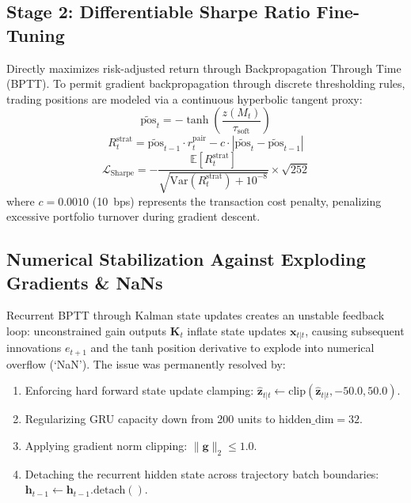 \documentclass[11pt, a4paper]{article}
\begin{document}
\subsection{Stage 2: Differentiable Sharpe Ratio Fine-Tuning}
Directly maximizes risk-adjusted return through Backpropagation Through Time (BPTT). To permit gradient backpropagation through discrete thresholding rules, trading positions are modeled via a continuous hyperbolic tangent proxy:
\begin{equation}
    \widetilde{\text{pos}}_t = -\tanh\left( \frac{z(M_t)}{\tau_{\text{soft}}} \right)
\end{equation}
\begin{equation}
    R_t^{\text{strat}} = \widetilde{\text{pos}}_{t-1} \cdot r_t^{\text{pair}} - c \cdot |\widetilde{\text{pos}}_t - \widetilde{\text{pos}}_{t-1}|
\end{equation}
\begin{equation}
    \mathcal{L}_{\text{Sharpe}} = - \frac{\mathbb{E}[R_t^{\text{strat}}]}{\sqrt{\text{Var}(R_t^{\text{strat}}) + 10^{-8}}} \times \sqrt{252}
\end{equation}
where $c = 0.0010$ (10~bps) represents the transaction cost penalty, penalizing excessive portfolio turnover during gradient descent.

\subsection{Numerical Stabilization Against Exploding Gradients \& NaNs}
Recurrent BPTT through Kalman state updates creates an unstable feedback loop: unconstrained gain outputs $\mathbf{K}_t$ inflate state updates $\mathbf{x}_{t|t}$, causing subsequent innovations $e_{t+1}$ and the tanh position derivative to explode into numerical overflow (`NaN'). The issue was permanently resolved by:
\begin{enumerate}
    \item Enforcing hard forward state update clamping: $\hat{\mathbf{z}}_{t|t} \leftarrow \text{clip}(\hat{\mathbf{z}}_{t|t}, -50.0, 50.0)$.
    \item Regularizing GRU capacity down from 200 units to $\text{hidden\_dim} = 32$.
    \item Applying gradient norm clipping: $\|\mathbf{g}\|_2 \le 1.0$.
    \item Detaching the recurrent hidden state across trajectory batch boundaries: $\mathbf{h}_{t-1} \leftarrow \mathbf{h}_{t-1}.\text{detach}()$.
\end{enumerate}
\end{document}
